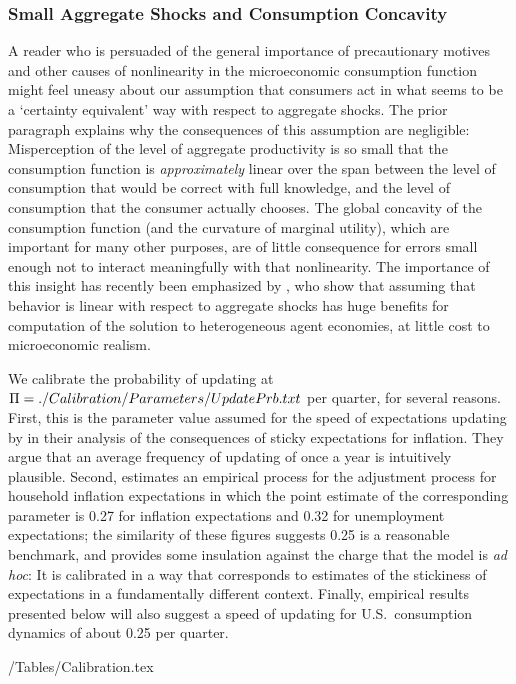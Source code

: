 \documentclass[titlepage]{\econtex}
\begin{document}
\subsubsection{Small Aggregate Shocks and Consumption Concavity}
A reader who is persuaded of the general importance of precautionary motives and other causes of nonlinearity in the microeconomic consumption function might feel uneasy about our assumption that consumers act in what seems to be a `certainty equivalent' way with respect to aggregate shocks.  The prior paragraph explains why the consequences of this assumption are negligible: Misperception of the level of aggregate productivity is so small that the consumption function is \textit{approximately} linear over the span between the level of consumption that would be correct with full knowledge, and the level of consumption that the consumer actually chooses.  The global concavity of the consumption function (and the curvature of marginal utility), which are important for many other purposes, are of little consequence for errors small enough not to interact meaningfully with that nonlinearity.  The importance of this insight has recently been emphasized by \cite{bmpMITshocks}, who show that assuming that behavior is linear with respect to aggregate shocks has huge benefits for computation of the solution to heterogeneous agent economies, at little cost to microeconomic realism.

We calibrate the probability of updating at $\Pi=  {./Calibration/Parameters/UpdatePrb.txt}$ per quarter, for several reasons.  First, this is the parameter value assumed for the speed of expectations updating by \cite{mrSlumps} in their analysis of the consequences of sticky expectations for inflation.  They argue that an average frequency of updating of once a year is intuitively plausible.  Second, \cite{carroll:epidemicinflQJE} estimates an empirical process for the adjustment process for household inflation expectations in which the point estimate of the corresponding parameter is 0.27 for inflation expectations and 0.32 for unemployment expectations; the similarity of these figures suggests 0.25 is a reasonable benchmark, and provides some insulation against the charge that the model is {\it ad hoc}: It is calibrated in a way that corresponds to estimates of the stickiness of expectations in a fundamentally different context.  Finally, empirical results presented below will also suggest a speed of updating for U.S.\ consumption dynamics of about 0.25 per quarter.

\econtexRoot/Tables/Calibration.tex
\end{document}
